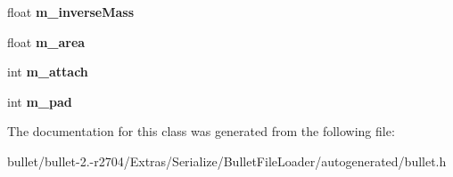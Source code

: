 \begin{DoxyCompactItemize}
\item 
\hypertarget{class_bullet_1_1_soft_body_node_data_a27f3b53cb8b8d102f95a012baa9b935e}{float {\bfseries m\+\_\+inverse\+Mass}}\label{class_bullet_1_1_soft_body_node_data_a27f3b53cb8b8d102f95a012baa9b935e}

\item 
\hypertarget{class_bullet_1_1_soft_body_node_data_ae1ceca90b2eb9d8e55e9a63716b97c55}{float {\bfseries m\+\_\+area}}\label{class_bullet_1_1_soft_body_node_data_ae1ceca90b2eb9d8e55e9a63716b97c55}

\item 
\hypertarget{class_bullet_1_1_soft_body_node_data_aa50dfd4e0c3d3ba35ebffdd5a141ec87}{int {\bfseries m\+\_\+attach}}\label{class_bullet_1_1_soft_body_node_data_aa50dfd4e0c3d3ba35ebffdd5a141ec87}

\item 
\hypertarget{class_bullet_1_1_soft_body_node_data_a7d99c610057b130a1474d544e03eca73}{int {\bfseries m\+\_\+pad}}\label{class_bullet_1_1_soft_body_node_data_a7d99c610057b130a1474d544e03eca73}

\end{DoxyCompactItemize}


The documentation for this class was generated from the following file\+:\begin{DoxyCompactItemize}
\item 
bullet/bullet-\/2.-\/r2704/\+Extras/\+Serialize/\+Bullet\+File\+Loader/autogenerated/bullet.\+h\end{DoxyCompactItemize}
